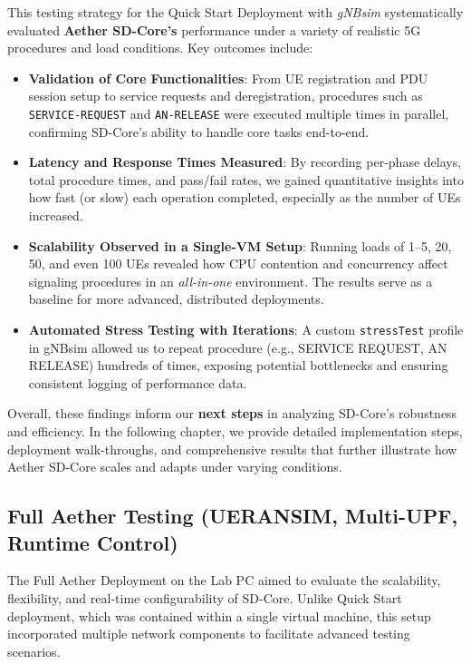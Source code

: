 This testing strategy for the Quick Start Deployment with \textit{gNBsim} systematically evaluated \textbf{Aether SD-Core’s} performance under a variety of realistic 5G procedures and load conditions. Key outcomes include:

\begin{itemize}
    \item \textbf{Validation of Core Functionalities}:  
    From UE registration and PDU session setup to service requests and deregistration, procedures such as \texttt{SERVICE-REQUEST} and \texttt{AN-RELEASE} were executed multiple times in parallel, confirming SD-Core’s ability to handle core tasks end-to-end.

    
    \item \textbf{Latency and Response Times Measured}:  
    By recording per-phase delays, total procedure times, and pass/fail rates, we gained quantitative insights into how fast (or slow) each operation completed, especially as the number of UEs increased.

    \item \textbf{Scalability Observed in a Single-VM Setup}:  
    Running loads of 1--5, 20, 50, and even 100 UEs revealed how CPU contention and concurrency affect signaling procedures in an \textit{all-in-one} environment. The results serve as a baseline for more advanced, distributed deployments.

    \item \textbf{Automated Stress Testing with Iterations}:  
    A custom \texttt{stressTest} profile in gNBsim allowed us to repeat procedure (e.g., SERVICE REQUEST, AN RELEASE) hundreds of times, exposing potential bottlenecks and ensuring consistent logging of performance data.
\end{itemize}

Overall, these findings inform our \textbf{next steps} in analyzing SD-Core’s robustness and efficiency. In the following chapter, we provide detailed implementation steps, deployment walk-throughs, and comprehensive results that further illustrate how Aether SD-Core scales and adapts under varying conditions.



\subsection{Full Aether Testing (UERANSIM, Multi-UPF, Runtime Control)}

The Full Aether Deployment on the Lab PC aimed to evaluate the scalability, flexibility, and real-time configurability of SD-Core. Unlike Quick Start deployment, which was contained within a single virtual machine, this setup incorporated multiple network components to facilitate advanced testing scenarios.

